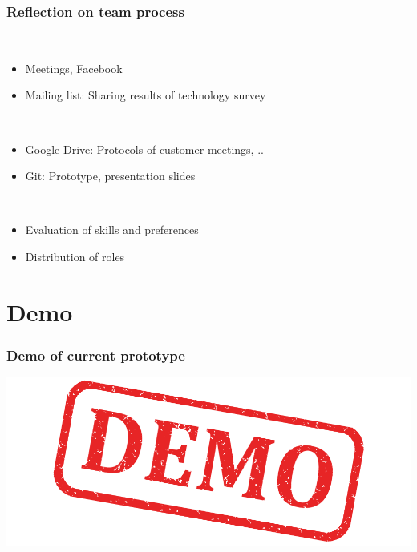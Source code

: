 \begin{frame}
  \frametitle{Reflection on team process}
  \begin{description}[]
    \item[Communication] \hfill \\
    \begin{itemize}
      \item Meetings, Facebook
      \item Mailing list: Sharing results of technology survey
    \end{itemize}
  \end{description}
  \begin{description}[]
    \item[Collaborative working] \hfill \\
    \begin{itemize}
      \item Google Drive: Protocols of customer meetings, ..
      \item Git: Prototype, presentation slides
    \end{itemize}
  \end{description}
  \begin{description}[]
    \item[Team member] \hfill \\
    \begin{itemize}
      \item Evaluation of skills and preferences
      \item Distribution of roles
    \end{itemize}
  \end{description}
\end{frame}

\section{Demo}

\begin{frame}
  \frametitle{Demo of current prototype}
  \includegraphics[width=\textwidth]{images/demo}
\end{frame}


